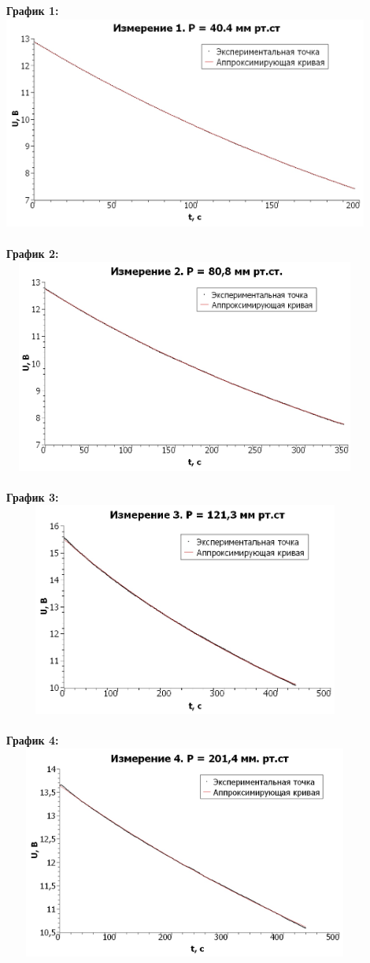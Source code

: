 \documentclass[15pt,a5paper,reqno]{article}
\begin{document}
    \noindent\textbf{График 1:}\\
    \includegraphics[width = 12cm, height = 7cm]{График 40,4.jpg}\\
    \\
    \noindent\textbf{График 2:}\\
    \includegraphics[width = 12cm, height = 7cm]{График 80,8.jpg}\\
    \\
    \noindent\textbf{График 3:}\\
    \includegraphics[width = 12cm, height = 7cm]{График 121,3.jpg}\\
    \\
    \noindent\textbf{График 4:}\\
    \includegraphics[width = 12cm, height = 7cm]{График 201,4.jpg}\\
    
\end{document}
